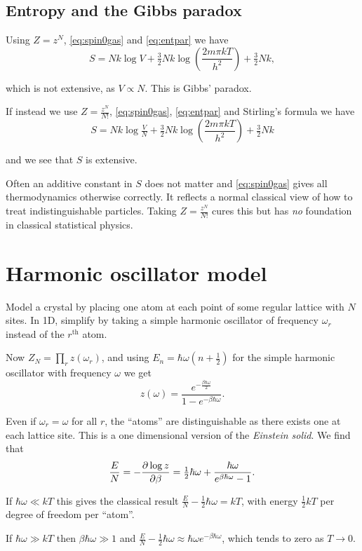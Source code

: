 \documentclass{notes}
\begin{document}
\subsection{Entropy and the Gibbs paradox}

Using $Z = z^N$, \eqref{eq:spin0gas} and \eqref{eq:entpar} we
have
\[
S = N k \log V + \tfrac{3}{2} N k \log \left( \frac{2 m \pi k T}{h^2} \right)
+ \tfrac{3}{2} Nk,
\]

which is not extensive, as $V \propto N$.  This is Gibbs' paradox.

If instead we use $Z = \tfrac{z^N}{N!}$, \eqref{eq:spin0gas},
\eqref{eq:entpar} and Stirling's formula we have
\[
S = N k \log \tfrac{V}{N} + \tfrac{3}{2} N k \log \left( \frac{2 m \pi
    k T}{h^2} \right) + \tfrac{3}{2} N k
\]

and we see that $S$ is extensive.

Often an additive constant in $S$ does not matter and
\eqref{eq:spin0gas} gives all thermodynamics otherwise correctly.
It reflects a normal classical view of how to treat
indistinguishable particles.  Taking $Z = \tfrac{z^N}{N!}$ cures this
but has \emph{no} foundation in classical statistical physics.

\section{Harmonic oscillator model}

Model a crystal by placing one atom at each point of some regular lattice
with $N$ sites.  In 1D, simplify by taking a simple harmonic oscillator
of frequency $\omega_r$ instead of the $r^{\text{th}}$ atom.

Now $Z_N = \prod_r z(\omega_r)$, and using $E_n = \hbar \omega
(n + \tfrac{1}{2})$ for the simple harmonic oscillator with frequency
$\omega$ we get
\[
z(\omega) = \frac{e^{-\frac{\beta \hbar \omega}{2}}}{1 - e^{-\beta \hbar
\omega}}.
\]

Even if $\omega_r = \omega$ for all $r$, the ``atoms'' are distinguishable
as there exists one at each lattice site.  This is a one dimensional version
of the \emph{Einstein solid}.  We find that
\[
\frac{E}{N} = - \frac{\partial \log z}{\partial \beta} = \tfrac{1}{2} \hbar \omega
+ \frac{\hbar\omega}{e^{\beta \hbar \omega} - 1}.
\]

If $\hbar \omega \ll k T$ this gives the classical result
$\tfrac{E}{N} - \tfrac{1}{2} \hbar \omega = k T$, with energy
$\tfrac{1}{2} k T$ per degree of freedom per ``atom''.

If $\hbar \omega \gg k T$ then $\beta \hbar \omega \gg 1$ and
$\tfrac{E}{N} - \tfrac{1}{2} \hbar \omega \approx \hbar \omega
e^{-\beta \hbar \omega}$, which tends to zero as $T \to 0$.
\end{document}
